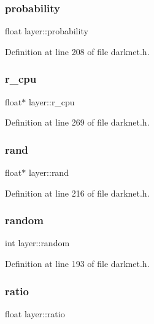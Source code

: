 \subsubsection{\texorpdfstring{probability}{probability}}
{\footnotesize\ttfamily float layer\+::probability}



Definition at line 208 of file darknet.\+h.

\mbox{\label{structlayer_aaaefd9c6dccae5505e5600831d99a026}} 
\subsubsection{\texorpdfstring{r\_cpu}{r\_cpu}}
{\footnotesize\ttfamily float$\ast$ layer\+::r\+\_\+cpu}



Definition at line 269 of file darknet.\+h.

\mbox{\label{structlayer_a254a888ee1b4383a7ce6035a88e7b825}} 
\subsubsection{\texorpdfstring{rand}{rand}}
{\footnotesize\ttfamily float$\ast$ layer\+::rand}



Definition at line 216 of file darknet.\+h.

\mbox{\label{structlayer_a411feca89284377c83dd97141540dd83}} 
\subsubsection{\texorpdfstring{random}{random}}
{\footnotesize\ttfamily int layer\+::random}



Definition at line 193 of file darknet.\+h.

\mbox{\label{structlayer_a2752501fc00b1ff2bdd19e0a24b5370c}} 
\subsubsection{\texorpdfstring{ratio}{ratio}}
{\footnotesize\ttfamily float layer\+::ratio}



